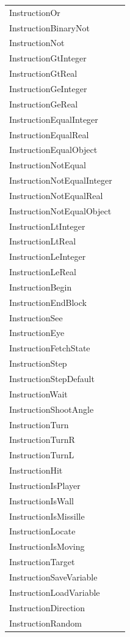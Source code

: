 \begin{center}
\begin{longtable}{|l|l|}
InstructionOr&\\
InstructionBinaryNot&\\
InstructionNot&\\
InstructionGtInteger&\\
InstructionGtReal&\\
InstructionGeInteger&\\
InstructionGeReal&\\
InstructionEqualInteger&\\
InstructionEqualReal&\\
InstructionEqualObject&\\
InstructionNotEqual&\\
InstructionNotEqualInteger&\\
InstructionNotEqualReal&\\
InstructionNotEqualObject&\\
InstructionLtInteger&\\
InstructionLtReal&\\
InstructionLeInteger&\\
InstructionLeReal&\\
InstructionBegin&\\
InstructionEndBlock&\\
InstructionSee&\\
InstructionEye&\\
InstructionFetchState&\\
InstructionStep&\\
InstructionStepDefault&\\
InstructionWait&\\
InstructionShootAngle&\\
InstructionTurn&\\
InstructionTurnR&\\
InstructionTurnL&\\
InstructionHit&\\
InstructionIsPlayer&\\
InstructionIsWall&\\
InstructionIsMissille&\\
InstructionLocate&\\
InstructionIsMoving&\\
InstructionTarget&\\
InstructionSaveVariable&\\
InstructionLoadVariable&\\
InstructionDirection&\\
InstructionRandom&\\
\hline
\end{longtable}
\end{center}

